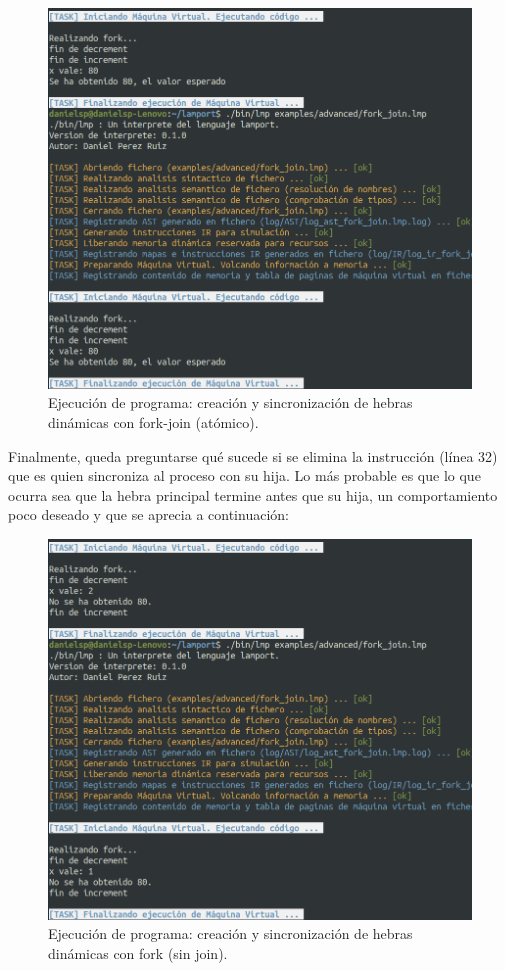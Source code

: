 \begin{figure}[h]
    \includegraphics[width=\linewidth]{images/ejemplos/concurrentes/fork_join_atomic.png}
    \caption{Ejecución de programa: creación y sincronización de hebras dinámicas con fork-join (atómico).}
    \label{fig:lamportForkJoinAtomic_exec}
\end{figure}

\newpage
Finalmente, queda preguntarse qué sucede si se elimina la instrucción  (línea 32) que es quien sincroniza al proceso  con su hija. Lo más probable es que lo que ocurra sea que la hebra principal termine antes que su hija, un comportamiento poco deseado y que se aprecia a continuación:

\begin{figure}[h]
    \includegraphics[width=\linewidth]{images/ejemplos/concurrentes/fork_without_join.png}
    \caption{Ejecución de programa: creación y sincronización de hebras dinámicas con fork (sin join).}
    \label{fig:lamportForkWithoutJoin_exec}
\end{figure}

